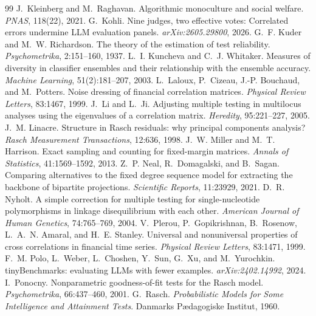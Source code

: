 \documentclass[pdflatex,sn-mathphys-ay]{sn-jnl}
\theoremstyle{thmstyleone}
\theoremstyle{thmstylethree}
\begin{document}
\begin{thebibliography}{99}
 J.~Kleinberg and M.~Raghavan. Algorithmic monoculture and social welfare. \emph{PNAS}, 118(22), 2021.
 G.~Kohli. Nine judges, two effective votes: Correlated errors undermine LLM evaluation panels. \emph{arXiv:2605.29800}, 2026.
 G.~F. Kuder and M.~W. Richardson. The theory of the estimation of test reliability. \emph{Psychometrika}, 2:151--160, 1937.
 L.~I. Kuncheva and C.~J. Whitaker. Measures of diversity in classifier ensembles and their relationship with the ensemble accuracy. \emph{Machine Learning}, 51(2):181--207, 2003.
 L.~Laloux, P.~Cizeau, J.-P. Bouchaud, and M.~Potters. Noise dressing of financial correlation matrices. \emph{Physical Review Letters}, 83:1467, 1999.
 J.~Li and L.~Ji. Adjusting multiple testing in multilocus analyses using the eigenvalues of a correlation matrix. \emph{Heredity}, 95:221--227, 2005.
 J.~M. Linacre. Structure in Rasch residuals: why principal components analysis? \emph{Rasch Measurement Transactions}, 12:636, 1998.
 J.~W. Miller and M.~T. Harrison. Exact sampling and counting for fixed-margin matrices. \emph{Annals of Statistics}, 41:1569--1592, 2013.
 Z.~P. Neal, R.~Domagalski, and B.~Sagan. Comparing alternatives to the fixed degree sequence model for extracting the backbone of bipartite projections. \emph{Scientific Reports}, 11:23929, 2021.
 D.~R. Nyholt. A simple correction for multiple testing for single-nucleotide polymorphisms in linkage disequilibrium with each other. \emph{American Journal of Human Genetics}, 74:765--769, 2004.
 V.~Plerou, P.~Gopikrishnan, B.~Rosenow, L.~A.~N. Amaral, and H.~E. Stanley. Universal and nonuniversal properties of cross correlations in financial time series. \emph{Physical Review Letters}, 83:1471, 1999.
 F.~M. Polo, L.~Weber, L.~Choshen, Y.~Sun, G.~Xu, and M.~Yurochkin. tinyBenchmarks: evaluating LLMs with fewer examples. \emph{arXiv:2402.14992}, 2024.
 I.~Ponocny. Nonparametric goodness-of-fit tests for the Rasch model. \emph{Psychometrika}, 66:437--460, 2001.
 G.~Rasch. \emph{Probabilistic Models for Some Intelligence and Attainment Tests}. Danmarks P\ae dagogiske Institut, 1960.

\end{thebibliography}
\end{document}
